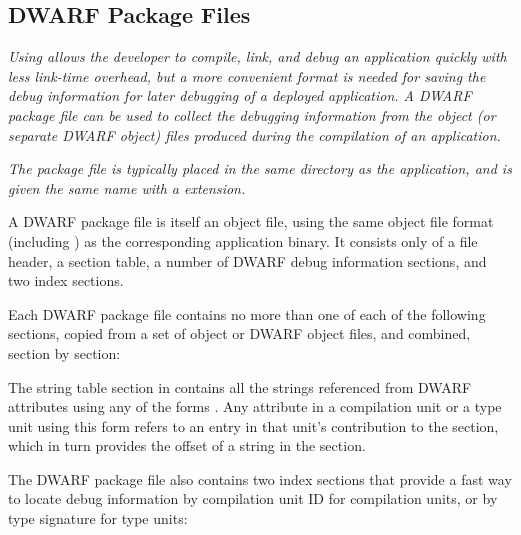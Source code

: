 \subsection{DWARF Package Files}
\label{datarep:dwarfpackagefiles}
\textit{Using  allows the developer to compile, 
link, and debug an application quickly with less link-time overhead,
but a more convenient format is needed for saving the debug
information for later debugging of a deployed application. A
DWARF package file can be used to collect the debugging
information from the object (or separate DWARF object) files
produced during the compilation of an application.}

\textit{The package file is typically placed in the same directory as the
application, and is given the same name with a 
extension.}

A DWARF package file is itself an object file, using the
same object file format (including \byteorder) as the
corresponding application binary. It consists only of a file
header, a section table, a number of DWARF debug information
sections, and two index sections.

Each DWARF package file contains no more than one of each of the
following sections, copied from a set of object or DWARF object
files, and combined, section by section:
\begin{alltt}
    \dotdebuginfodwo
    \dotdebugabbrevdwo
    \dotdebuglinedwo
    \dotdebugloclistsdwo
    \dotdebugrnglistsdwo
    \dotdebugstroffsetsdwo
    \dotdebugstrdwo
    \dotdebugmacrodwo
\end{alltt}

The string table section in \dotdebugstrdwo{} contains all the
strings referenced from DWARF attributes using 
\bb
any of the forms
\eb
\DWFORMstrxXNor. Any attribute in a compilation unit or a type
unit using this form refers to an entry in that unit's
contribution to the \dotdebugstroffsetsdwo{} section, which in turn
provides the offset of a string in the \dotdebugstrdwo{}
section.

The DWARF package file also contains two index sections that
provide a fast way to locate debug information by compilation
unit ID for compilation units, or by type
signature for type units:
\begin{alltt}
    \dotdebugcuindex
    \dotdebugtuindex
\end{alltt}

